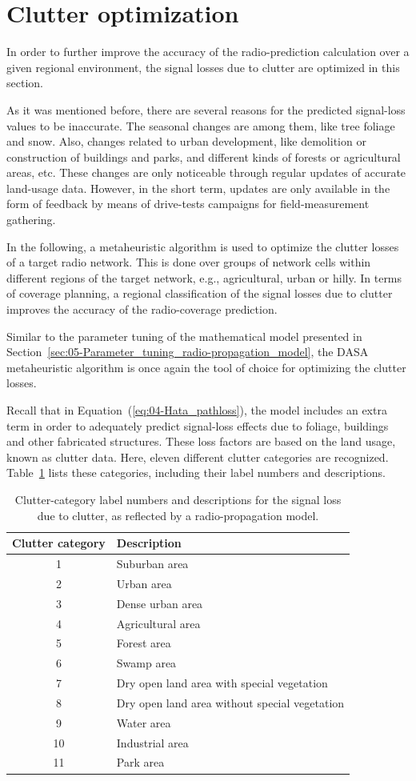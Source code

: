 \section{Clutter optimization \label{sec:05-Clutter_optimization}}

In order to further improve the accuracy of the radio-prediction calculation
over a given regional environment, the signal losses due to clutter
are optimized in this section.

As it was mentioned before, there are several reasons for the predicted
signal-loss values to be inaccurate. The seasonal changes are among
them, like tree foliage and snow. Also, changes related to urban development,
like demolition or construction of buildings and parks, and different
kinds of forests or agricultural areas, etc. These changes are only
noticeable through regular updates of accurate land-usage data. However,
in the short term, updates are only available in the form of feedback
by means of drive-tests campaigns for field-measurement gathering.

In the following, a metaheuristic algorithm is used to optimize the
clutter losses of a target radio network. This is done over groups
of network cells within different regions of the target network, e.g.,
agricultural, urban or hilly. In terms of coverage planning, a regional
classification of the signal losses due to clutter improves the accuracy
of the radio-coverage prediction.

Similar to the parameter tuning of the mathematical model presented
in Section~\ref{sec:05-Parameter_tuning_radio-propagation_model},
the DASA metaheuristic algorithm is once again the tool of choice
for optimizing the clutter losses.

Recall that in Equation~(\ref{eq:04-Hata_pathloss}), the model includes
an extra term in order to adequately predict signal-loss effects due
to foliage, buildings and other fabricated structures. These loss
factors are based on the land usage, known as clutter data. Here,
eleven different clutter categories are recognized. Table~\ref{tab:05-Clutter_categories}
lists these categories, including their label numbers and descriptions. 

\begin{table}
\centering

\caption{Clutter-category label numbers and descriptions for the signal loss
due to clutter, as reflected by a radio-propagation model. \label{tab:05-Clutter_categories}}


\begin{tabular}{cl}
\hline 
Clutter category & Description\tabularnewline
\hline 
1 & Suburban area \tabularnewline
2 & Urban area\tabularnewline
3 & Dense urban area\tabularnewline
4 & Agricultural area\tabularnewline
5 & Forest area\tabularnewline
6 & Swamp area\tabularnewline
7 & Dry open land area with special vegetation\tabularnewline
8 & Dry open land area without special vegetation\tabularnewline
9 & Water area\tabularnewline
10 & Industrial area\tabularnewline
11  & Park area\tabularnewline
\hline 
\end{tabular}
\end{table}



